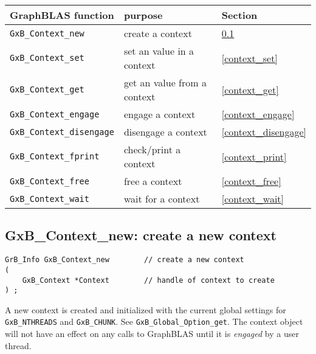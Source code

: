\documentclass[12pt]{article}
\begin{document}
\vspace{0.2in}
{\footnotesize
\begin{tabular}{lll}
\hline
GraphBLAS function   & purpose                                      & Section \\
\hline
\verb'GxB_Context_new'           & create a context                     & \ref{context_new} \\
\verb'GxB_Context_set'           & set an value in a context            & \ref{context_set} \\
\verb'GxB_Context_get'           & get an value from a context          & \ref{context_get} \\
\verb'GxB_Context_engage'        & engage a context                     & \ref{context_engage} \\
\verb'GxB_Context_disengage'     & disengage a context                  & \ref{context_disengage} \\
\verb'GxB_Context_fprint'        & check/print a context                & \ref{context_print} \\
\verb'GxB_Context_free'          & free a context                       & \ref{context_free} \\
\verb'GxB_Context_wait'          & wait for a context                   & \ref{context_wait} \\
\hline
\end{tabular}
}

\subsection{{\sf GxB\_Context\_new:}  create a new context}
\label{context_new}

\begin{mdframed}[userdefinedwidth=6in]
{\footnotesize
\begin{verbatim}
GrB_Info GxB_Context_new        // create a new context
(
    GxB_Context *Context        // handle of context to create
) ;
\end{verbatim} } \end{mdframed}

A new context is created and initialized with the current global settings for
\verb'GxB_NTHREADS' and \verb'GxB_CHUNK'.  See \verb'GxB_Global_Option_get'.
The context object will not have an effect on any calls to GraphBLAS until it
is {\em engaged} by a user thread.
\end{document}
